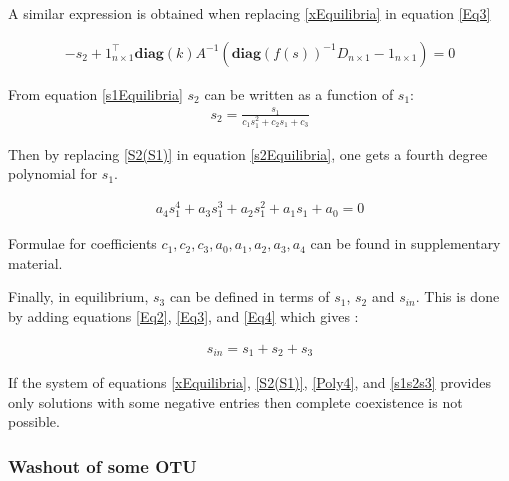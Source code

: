 \documentclass[3p,times]{elsarticle}
\newcommand{\diag}{\textbf{diag}}
\begin{document}
A similar expression is obtained when replacing \eqref{xEquilibria} in equation \eqref{Eq3}

\begin{align}
\label{s2Equilibria}-s_2+
1_{n\times 1}^{\top}\diag (k)  A^{-1}(\diag(f(s))^{-1}D_{n\times 1}-1_{n\times 1}) = 0
\end{align}

From equation \eqref{s1Equilibria} $s_2$ can be written as a function of $s_1$:
\begin{align}
s_2 = \frac{s_1}{c_1s_1^2+c_2s_1+c_3} \label{S2(S1)}
\end{align}


Then by replacing  \eqref{S2(S1)} in equation \eqref{s2Equilibria}, one gets a fourth degree polynomial for $s_1$. 

\begin{align}
\label{Poly4} a_4s_1^4+a_3s_1^3+a_2s_1^2+a_1s_1+a_0 = 0
\end{align}


Formulae for coefficients $c_1, c_2, c_3, a_0, a_1, a_2, a_3, a_4$ can be found in supplementary material. 

Finally, in equilibrium, $s_3$ can be defined in terms of $s_1$, $s_2$ and $s_{in}$. This is done by adding equations \eqref{Eq2}, \eqref{Eq3},  and \eqref{Eq4} which gives :

\begin{align}
s_{in} = s_1+s_2+s_3 \label{s1s2s3}
\end{align}

If the system of equations \eqref{xEquilibria}, \eqref{S2(S1)}, \eqref{Poly4}, and \eqref{s1s2s3} provides only solutions with some negative entries then complete coexistence is not possible.

\subsubsection{Washout of some OTU}
\end{document}
